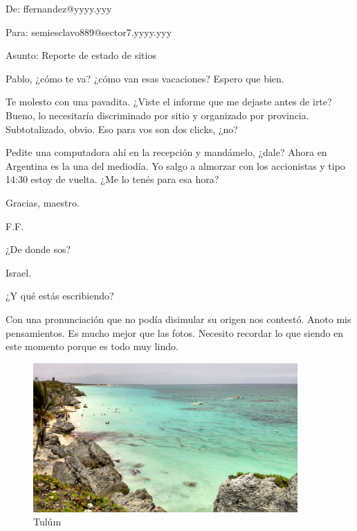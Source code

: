\documentclass[12pt,twoside,openright,a5paper]{book}
\begin{document}
De: ffernandez@yyyy.yyy

Para: semiesclavo889@sector7.yyyy.yyy

Asunto: Reporte de estado de sitios

\vspace{0.5cm}

Pablo, ¿cómo te va? ¿cómo van esas vacaciones? Espero que bien.

Te molesto con una pavadita. ¿Viste el informe que me dejaste antes de irte?
Bueno, lo necesitaría discriminado por sitio y organizado por provincia.
Subtotalizado, obvio. Eso para vos son dos clicks, ¿no?

Pedite una computadora ahí en la recepción y mandámelo, ¿dale? Ahora en
Argentina es la una del mediodía. Yo salgo a almorzar con los accionistas
y tipo 14:30 estoy de vuelta. ¿Me lo tenés para esa hora?

Gracias, maestro.

\vspace{0.5cm}

F.F.


\vspace{0.5cm}
\hrulefill\hspace{0.2cm} \decofourleft\decofourright \hspace{0.2cm} \hrulefill
\vspace{0.5cm}

¿De donde sos?

Israel.

¿Y qué estás escribiendo?

Con una pronunciación que no podía disimular su origen nos contestó. Anoto
mis pensamientos. Es mucho mejor que las fotos. Necesito recordar lo que
siendo en este momento porque es todo muy lindo.

\begin{figure}[H]
  \centering
    \includegraphics[width=0.9\textwidth]{fotos/2013/tulum}
  \caption{Tulúm}
  \label{Tulúm}
\end{figure}
\end{document}
